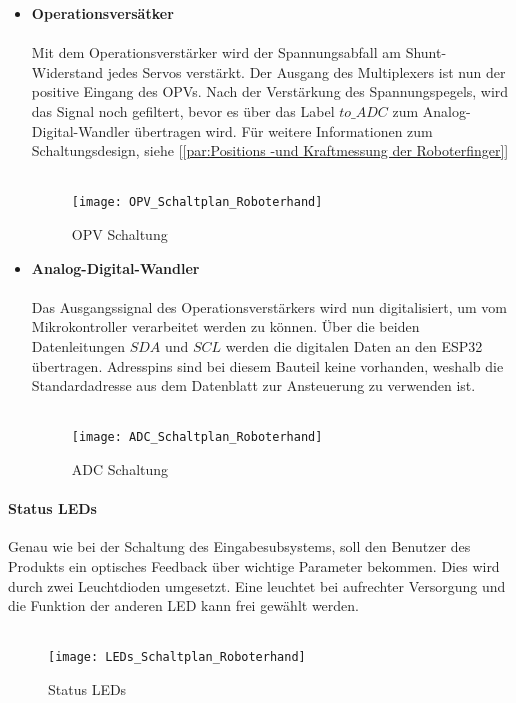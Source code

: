 \documentclass[titlepage,12pt,twoside]{article}
\begin{document}
\begin{itemize}
	\item \textbf{Operationsversätker} \\
	\\
	Mit dem Operationsverstärker wird der Spannungsabfall am Shunt-Widerstand jedes Servos verstärkt. Der Ausgang des Multiplexers ist nun der positive Eingang des OPVs. Nach der Verstärkung des Spannungspegels, wird
	das Signal noch gefiltert, bevor es über das Label $to\_ADC$ zum Analog-Digital-Wandler übertragen wird. Für weitere Informationen zum Schaltungsdesign, siehe [\textcolor{blue}{\autoref{par:Positions -und Kraftmessung der Roboterfinger}}] \\
	\\
	\begin{figure}[H]
		\begin{center}
			\scalebox{0.6}
			{\texttt{[image: OPV\_Schaltplan\_Roboterhand]}}
			\caption{OPV Schaltung}
			\label{fig:OPV_Schaltplan_Roboterhand}		
		\end{center}
	\end{figure}
	\hfill \break

	\item \textbf{Analog-Digital-Wandler} \\
	\\
	Das Ausgangssignal des Operationsverstärkers wird nun digitalisiert, um vom Mikrokontroller verarbeitet werden zu können. Über die beiden Datenleitungen $SDA$ und $SCL$ werden die digitalen Daten an den ESP32 übertragen. 
	Adresspins sind bei diesem Bauteil keine vorhanden, weshalb die Standardadresse aus dem Datenblatt zur Ansteuerung zu verwenden ist. \\
	\\
	\begin{figure}[H]
		\begin{center}
			\scalebox{0.6}
			{\texttt{[image: ADC\_Schaltplan\_Roboterhand]}}
			\caption{ADC Schaltung}
			\label{fig:ADC_Schaltplan_Roboterhand}			
		\end{center}
	\end{figure}
	\hfill \break
\end{itemize}

\paragraph{Status LEDs}
\hfill \break
\hfill \break
Genau wie bei der Schaltung des Eingabesubsystems, soll den Benutzer des Produkts ein optisches Feedback über wichtige Parameter bekommen. Dies wird durch zwei Leuchtdioden umgesetzt. Eine leuchtet bei aufrechter Versorgung und die
Funktion der anderen LED kann frei gewählt werden. \\
\\
\begin{figure}[H]
	\begin{center}
		\scalebox{0.6}
		{\texttt{[image: LEDs\_Schaltplan\_Roboterhand]}}
		\caption{Status LEDs}
		\label{fig:LEDs_Schaltplan_Roboterhand}		
	\end{center}
\end{figure}
\hfill \break
\end{document}
